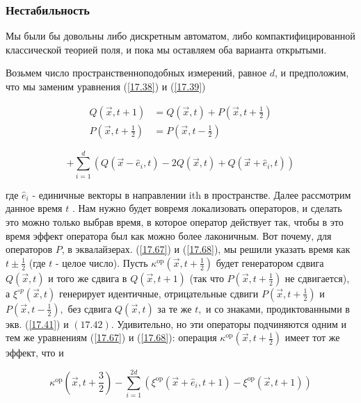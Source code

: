 \documentclass[main.tex]{subfiles}
\begin{document}
\subsubsection{Нестабильность}\label{ch17.2.1}

Мы были бы довольны либо дискретным автоматом, либо компактифицированной классической теорией поля, и пока мы оставляем оба варианта открытыми.

Возьмем число пространственноподобных измерений, равное $d$, и предположим, что мы заменим уравнения (\ref{17.38}) и (\ref{17.39})

\begin{equation}\label{17.67}
	\begin{aligned} Q(\vec{x}, t+1) &=Q(\vec{x}, t)+P\left(\vec{x}, t+\frac{1}{2}\right) \\ P\left(\vec{x}, t+\frac{1}{2}\right) &=P\left(\vec{x}, t-\frac{1}{2}\right) \end{aligned}
\end{equation}


\begin{equation}\label{17.68}
	+\sum_{i=1}^{d}\left(Q\left(\vec{x}-\hat{e}_{i}, t\right)-2 Q(\vec{x}, t)+Q\left(\vec{x}+\hat{e}_{i}, t\right)\right)
\end{equation}

где $\hat e_i$ - единичные векторы в направлении ith в пространстве.
Далее рассмотрим данное время $t$ . Нам нужно будет вовремя локализовать операторов, и сделать это можно только выбрав время, в которое оператор действует так, чтобы в это время эффект оператора был как можно более лаконичным. Вот почему, для операторов $P$, в эквалайзерах. (\ref{17.67}) и (\ref{17.68}), мы решили указать время как $t \pm \frac{1}{2}$ (где $t$ - целое число). Пусть $\kappa^{\mathrm{op}}\left(\vec{x}, t+\frac{1}{2}\right)$ будет генератором сдвига $Q(\vec{x}, t)$ и того же сдвига в $Q(\vec{x}, t+1)$ (так что $P\left(\vec{x}, t+\frac{1}{2}\right)$ не сдвигается), а $\xi^{\circ p}(\vec{x}, t)$ генерирует идентичные, отрицательные сдвиги $P\left(\vec{x}, t+\frac{1}{2}\right)$ и $P\left(\vec{x}, t-\frac{1}{2}\right),$ без сдвига $Q(\vec{x}, t)$ за те же $t,$ и со знаками, продиктованными в экв. (\ref{17.41}) и $(17.42)$. Удивительно, но эти операторы подчиняются одним и тем же уравнениям (\ref{17.67}) и (\ref{17.68}): операция
$\kappa^{\mathrm{op}}\left(\vec{x}, t+\frac{1}{2}\right)$ имеет тот же эффект, что и

\begin{equation}
\kappa^{\mathrm{op}}\left(\vec{x}, t+\frac{3}{2}\right)-\sum_{i=1}^{2 d}\left(\xi^{\mathrm{op}}\left(\vec{x}+\hat{e}_{i}, t+1\right)-\xi^{\mathrm{op}}(\vec{x}, t+1)\right)
\end{equation}
\end{document}
